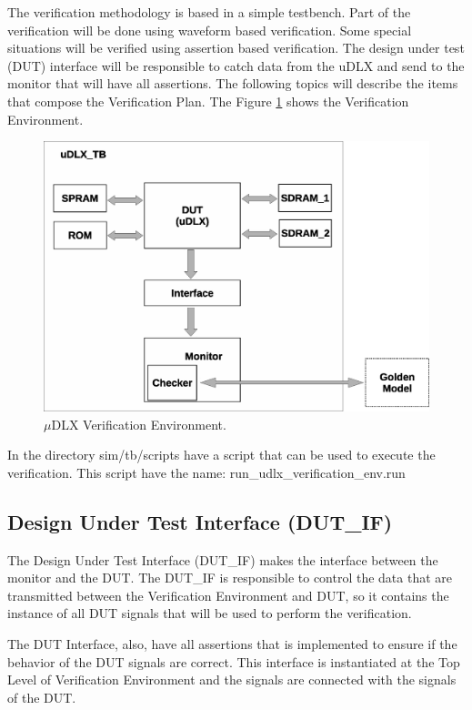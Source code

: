 \documentclass{article}
\begin{document}
	The verification methodology is based in a simple testbench. Part of the verification will be done using waveform based verification. Some special situations will be verified using assertion based verification. The design under test (DUT) interface will be responsible to catch data from the uDLX and send to the monitor that will have all assertions. The following topics will describe the items that compose the Verification Plan. The Figure \ref{fig:ver_env} shows the Verification Environment. 
	
		
	\begin{figure}[H]
    	\centering
    	\includegraphics[width=.7\linewidth]{pictures/verification_environment_v2.eps}
    	\caption{$\mu$DLX Verification Environment.}
    	\label{fig:ver_env}
  	\end{figure} 

	In the directory sim\//tb/scripts have a script that can be used to execute the verification. This script have the name: run\_udlx\_verification\_env.run	
	
	\subsection{Design Under Test Interface (DUT\_IF)}
	
	The Design Under Test Interface (DUT\_IF) makes the interface between the monitor and the DUT. The DUT\_IF is responsible to control the data that are transmitted between the Verification Environment and DUT, so it contains the instance of all DUT signals that will be used to perform the verification.
	
The DUT Interface, also, have all assertions that is implemented to ensure if the behavior of the DUT signals are correct. 
This interface is instantiated at the Top Level of Verification Environment and the signals are connected with the signals of the DUT.
\end{document}
